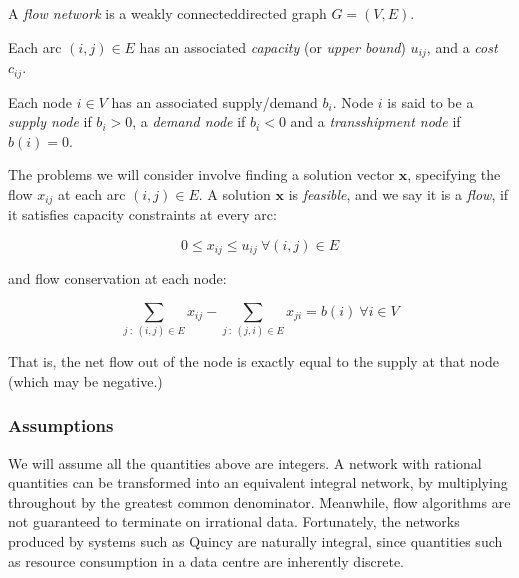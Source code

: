 A \emph{flow network} is a weakly connected\footnotemark directed graph $G=(V,E)$.

Each arc $(i,j)\in E$ has an associated \emph{capacity} (or \emph{upper	bound}\footnotemark) $u_{ij}$, and a \emph{cost} $c_{ij}$.

Each node $i\in V$ has an associated supply/demand $b_{i}$. Node $i$ is said to be a \emph{supply node} if $b_{i}>0$, a \emph{demand	node} if $b_{i}<0$ and a \emph{transshipment node} if $b(i)=0$.

The problems we will consider involve finding a solution vector $\mathbf{x}$,
specifying the flow $x_{ij}$ at each arc $(i,j)\in E$. A solution
$\mathbf{x}$ is \emph{feasible}, and we say it is a \emph{flow}, if it satisfies capacity constraints at every arc:

\begin{equation}
0\leq x_{ij}\leq u_{ij}\:\forall(i,j)\in E
\end{equation}\label{eq:capacity-constraints}

and flow conservation at each node:

\begin{equation}
\sum_{j\::\:(i,j)\in E}x_{ij}-\sum_{j\::\:(j,i)\in E}x_{ji}=b(i)\:\forall i\in V
\end{equation} \label{eq:flow-conservation}

That is, the net flow out of the node is exactly equal to the supply
at that node (which may be negative.)

\subsubsection{Assumptions}

We will assume all the quantities above are integers. A network with rational quantities can be transformed into an equivalent integral network, by multiplying throughout by the greatest common denominator. Meanwhile, flow algorithms are not guaranteed to terminate on irrational data. Fortunately, the networks produced by systems such as Quincy are naturally integral, since quantities such as resource consumption in a data centre
are inherently discrete.

